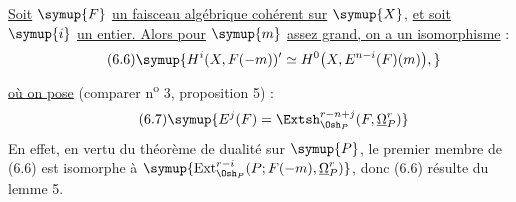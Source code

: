  \uline{Soit} $\symup{F}$ \uline{un faisceau algébrique cohérent sur} $\symup{X}$, \uline{et
soit} $\symup{i}$ \uline{un entier. Alors pour} $\symup{m}$ \uline{assez grand, on a un isomorphisme} :
\begin{equation}\tag{6.6}
  \symup{H^{i}(X,F(-m))'
  \simeq H^{0}\bigl(X,E^{n-i}(F)(m)\bigr),}
\end{equation}
\uline{où on pose} (comparer n\textsuperscript{o} 3, proposition 5) :
\begin{equation}\tag{6.7}
  \symup{E^{j}(F)=\Extsh_{\Osh_P}^{r-n+j}(F,\underline{\Omega}_P^{r})}
\end{equation}
En effet, en vertu du théorème de dualité sur $\symup{P}$, le premier membre de (6.6)
est isomorphe à
$\symup{\operatorname{Ext}_{\Osh_P}^{r-i}(P;F(-m),\underline{\Omega}_P^{r})}$, donc (6.6) résulte
du lemme 5.

